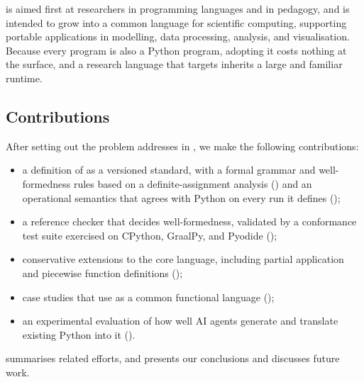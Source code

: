 \PurePy is aimed first at researchers in programming languages and in pedagogy, and is intended to grow into a
common language for scientific computing, supporting portable applications in modelling, data processing,
analysis, and visualisation. Because every \PurePy program is also a Python program, adopting it costs nothing
at the surface, and a research language that targets \PurePy inherits a large and familiar runtime.

\subsection{Contributions}

After setting out the problem \PurePy addresses in , we make the following
contributions:
\begin{itemize}
\item a definition of \PurePy as a versioned standard, with a formal grammar and well-formedness rules based on
a definite-assignment analysis () and an operational semantics that agrees with Python on
every run it defines ();
\item a reference checker that decides well-formedness, validated by a conformance test suite
exercised on CPython,  GraalPy, and Pyodide ();
\item conservative extensions to the core language, including partial application and piecewise function
definitions ();
\item case studies that use \PurePy as a common functional language ();
\item an experimental evaluation of how well AI agents generate \PurePy and translate existing Python into it
().
\end{itemize}
 summarises related efforts, and  presents our conclusions
and discusses future work.
